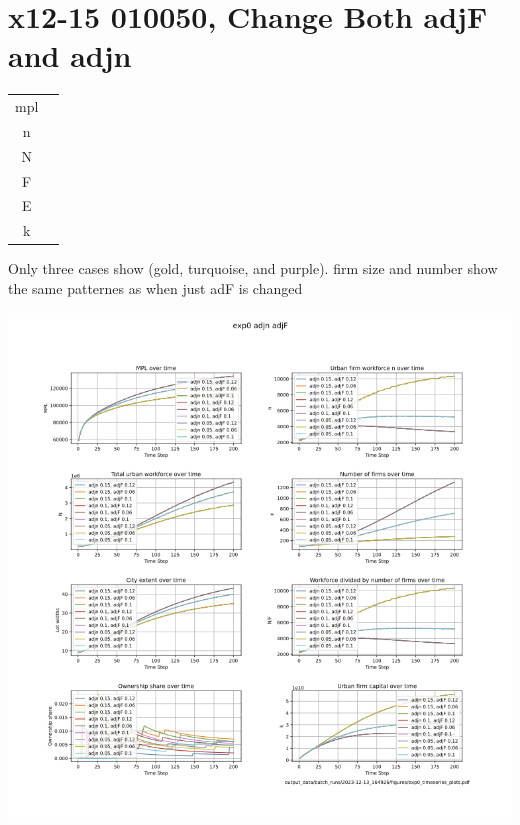 \documentclass{article}
\begin{document}
 \section{x12-15 010050, Change  Both adjF and adjn}
\begin{multicols}{2}
\begin{tabular}{c|c}
  mpl  &  \\
  n   &  \\
  N   &  \\
  F   &  \\
  E   &  \\
  k   & 
\end{tabular} 
Only three cases show (gold, turquoise, and purple). firm size and number show the same patternes as when just adF is changed 
\end{multicols}

\includegraphics[scale=.55]{fig/Analysis/F-n-adjustment-speed.png}
\end{document}
